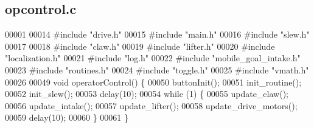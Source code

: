 \subsection{opcontrol.\+c}
\label{opcontrol_8c_source}

\begin{DoxyCode}
00001 
00014 \textcolor{preprocessor}{#include "drive.h"}
00015 \textcolor{preprocessor}{#include "main.h"}
00016 \textcolor{preprocessor}{#include "slew.h"}
00017 
00018 \textcolor{preprocessor}{#include "claw.h"}
00019 \textcolor{preprocessor}{#include "lifter.h"}
00020 \textcolor{preprocessor}{#include "localization.h"}
00021 \textcolor{preprocessor}{#include "log.h"}
00022 \textcolor{preprocessor}{#include "mobile_goal_intake.h"}
00023 \textcolor{preprocessor}{#include "routines.h"}
00024 \textcolor{preprocessor}{#include "toggle.h"}
00025 \textcolor{preprocessor}{#include "vmath.h"}
00026 
00049 \textcolor{keywordtype}{void} operatorControl() \{
00050   buttonInit();
00051   init_routine();
00052   init_slew();
00053   delay(10);
00054   \textcolor{keywordflow}{while} (1) \{
00055     update_claw();
00056     update_intake();
00057     update_lifter();
00058     update_drive_motors();
00059     delay(10);
00060   \}
00061 \}
\end{DoxyCode}
